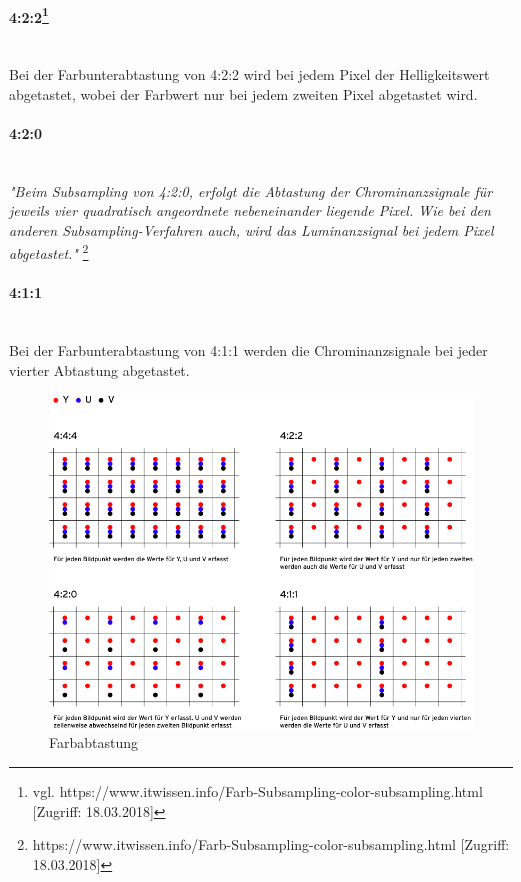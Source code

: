 \paragraph[4:2:2]{4:2:2\protect\footnote{\label{}vgl. https://www.itwissen.info/Farb-Subsampling-color-subsampling.html [Zugriff: 18.03.2018]}}
\leavevmode \\
Bei der Farbunterabtastung von 4:2:2 wird bei jedem Pixel der Helligkeitswert abgetastet, wobei der Farbwert nur bei jedem zweiten Pixel abgetastet wird. 
\paragraph{4:2:0}
\leavevmode \\
\textit{"Beim Subsampling von 4:2:0, erfolgt die Abtastung der Chrominanzsignale für jeweils vier quadratisch angeordnete nebeneinander liegende Pixel. Wie bei den anderen Subsampling-Verfahren auch, wird das Luminanzsignal bei jedem Pixel abgetastet."} \footnote{\label{}https://www.itwissen.info/Farb-Subsampling-color-subsampling.html [Zugriff: 18.03.2018]}
\paragraph{4:1:1}
\leavevmode \\
Bei der Farbunterabtastung von 4:1:1 werden die Chrominanzsignale bei jeder vierter Abtastung abgetastet.
\begin{figure}[H]
	\centering
	\includegraphics[width=1.0\textwidth]{abb15} 
	\caption{Farbabtastung}
\end{figure}

